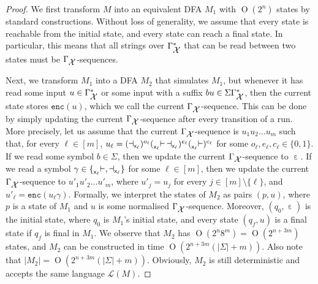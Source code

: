 \documentclass[
a4paper
]{article}
\theoremstyle{plain}
\theoremstyle{definition}
\theoremstyle{remark}
\DeclareMathOperator{\eword}{\varepsilon}
\newcommand{\varset}{\mbox{\ensuremath{\mathcal{X}}}}
\DeclareMathOperator{\openmark}{\vdash}
\DeclareMathOperator{\closemark}{\dashv}
\newcommand{\open}[1]{\prescript{}{#1}{\openmark}}
\newcommand{\close}[1]{\closemark_{#1}}
\newcommand{\varsx}{\ensuremath{\textsf{x}}}
\newcommand{\lang}[1]{\ensuremath{\mathcal{L}(#1)}}
\newcommand{\nrefw}[1]{\ensuremath{\mathtt{enc}(#1)}}
\DeclareMathOperator{\bigo}{O}
\begin{document}
\begin{proof}
We first transform $M$ into an equivalent DFA $M_1$ with $\bigo(2^n)$ states by standard constructions. Without loss of generality, we assume that every state is reachable from the initial state, and every state can reach a final state. In particular, this means that all strings over $\Gamma_{\varset}^*$ that can be read between two states must be $\Gamma_{\varset}$-sequences.

Next, we transform $M_1$ into a DFA $M_2$ that simulates $M_1$, but whenever it has read some input $u \in \Gamma_{\varset}^*$ or some input with a suffix $b u \in \Sigma \Gamma_{\varset}^* $, then the current state stores $\nrefw{u}$, which we call the current $\Gamma_{\varset}$-sequence. This can be done by simply updating the current $\Gamma_{\varset}$-sequence after every transition of a run. More precisely, let us assume that the current $\Gamma_{\varset}$-sequence is $u_1 u_2 \ldots u_m$ such that, for every $\ell \in [m]$, $u_\ell = (\close{\varsx_\ell})^{o_\ell} (\open{\varsx_\ell} \close{\varsx_\ell})^{e_\ell} (\open{\varsx_\ell})^{c_\ell}$ for some $o_\ell, e_\ell, c_\ell \in \{0, 1\}$. If we read some symbol $b \in \Sigma$, then we update the current $\Gamma_{\varset}$-sequence to $\eword$. If we read a symbol $\gamma \in \{\open{\varsx_{\ell}}, \close{\varsx_{\ell}}\}$ for some $\ell \in [m]$, then we update the current $\Gamma_{\varset}$-sequence to $u'_1 u'_2 \ldots u'_m$, where $u'_j = u_j$ for every $j \in [m] \setminus \{\ell\}$, and $u'_{\ell} = \nrefw{u_\ell \gamma}$. Formally, we interpret the states of $M_2$ as pairs $(p, u)$, where $p$ is a state of $M_1$ and $u$ is some normalised $\Gamma_{\varset}$-sequence. Moreover, $(q_0, \eword)$ is the initial state, where $q_0$ is $M_1$'s initial state, and every state $(q_f, u)$ is a final state if $q_f$ is final in $M_1$. We observe that $M_2$ has $\bigo(2^n 8^{m}) = \bigo(2^{n + 3m})$ states, and $M_2$ can be constructed in time $\bigo(2^{n + 3m} (|\Sigma| + m))$. Also note that $|M_2| = \bigo(2^{n + 3m} (|\Sigma| + m))$. Obviously, $M_2$ is still deterministic and accepts the same language $\lang{M}$. 


\end{proof}
\end{document}
